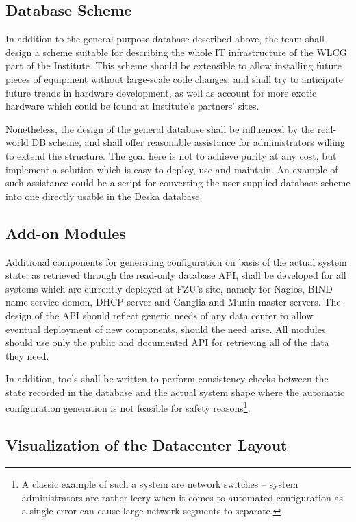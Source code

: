 \documentclass{article}
\begin{document}
\subsection{Database Scheme}

In addition to the general-purpose database described above, the team shall design a scheme suitable for describing the whole IT
infrastructure of the WLCG part of the Institute.  This scheme should be extensible to allow installing future pieces of equipment
without large-scale code changes, and shall try to anticipate future trends in hardware development, as well as account for more
exotic hardware which could be found at Institute's partners' sites.

Nonetheless, the design of the general database shall be influenced by the real-world DB scheme, and shall offer reasonable
assistance for administrators willing to extend the structure.  The goal here is not to achieve purity at any cost, but implement
a solution which is easy to deploy, use and maintain.  An example of such assistance could be a script for converting the
user-supplied database scheme into one directly usable in the Deska database. 

\subsection{Add-on Modules}

Additional components for generating configuration on basis of the actual system state, as retrieved through the read-only
database API, shall be developed for all systems which are currently deployed at FZU's site, namely for Nagios, BIND name service
demon, DHCP server and Ganglia and Munin master servers.  The design of the API should reflect generic needs of any data center to
allow eventual deployment of new components, should the need arise.  All modules should use only the public and documented API for
retrieving all of the data they need.

In addition, tools shall be written to perform consistency checks between the state recorded in the database and the actual system
shape where the automatic configuration generation is not feasible for safety reasons\footnote{A classic example of such a system
are network switches -- system administrators are rather leery when it comes to automated configuration as a single error can
cause large network segments to separate.}.

\subsection{Visualization of the Datacenter Layout}
\end{document}
